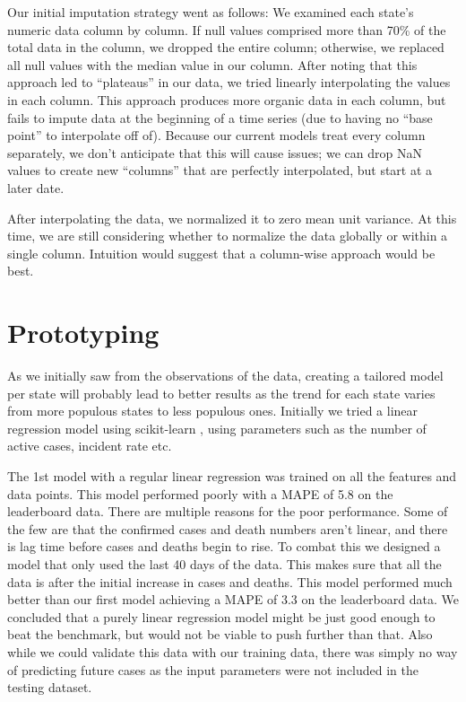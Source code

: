 \documentclass[sigconf,nonacm]{acmart}
\begin{document}
Our initial imputation strategy went as follows: 
We examined each state’s numeric data column by column. If null values
comprised more than 70\% of the total data in the column, we dropped the entire
column; otherwise, we replaced all null values with the median value in our
column. 
After noting that this approach led to “plateaus” in our data, we tried
linearly interpolating the values in each column. This approach produces more
organic data in each column, but fails to impute data at the beginning of a
time series (due to having no “base point” to interpolate off of). Because our
current models treat every column separately, we don’t anticipate that this
will cause issues; we can drop NaN values to create new “columns” that are
perfectly interpolated, but start at a later date.  

After interpolating the data, we normalized it to zero mean unit variance. At
this time, we are still considering whether to normalize the data globally or
within a single column. Intuition would suggest that a column-wise approach
would be best.

\section{Prototyping}

As we initially saw from the observations of the data, creating a tailored
model per state will probably lead to better results as the trend for each
state varies from more populous states to less populous ones. Initially we
tried a linear regression model using scikit-learn \cite{scikit-learn}, using
parameters such as the number of active cases, incident rate etc. 

The 1st model with a regular linear regression was trained on all the features
and data points. This model performed poorly with a MAPE of 5.8 on the
leaderboard data. There are multiple reasons for the poor performance. Some of
the few are that the confirmed cases and death numbers aren't linear, and there
is lag time before cases and deaths begin to rise. To combat this we designed a
model that only used the last 40 days of the data. This makes sure that all the
data is after the initial increase in cases and deaths. This model performed
much better than our first model achieving a MAPE of 3.3 on the leaderboard
data. We concluded that a purely linear regression model might be just good
enough to beat the benchmark, but would not be viable to push further than
that.  Also while we could validate this data with our training data, there was
simply no way of predicting future cases as the input parameters were not
included in the testing dataset. 
\end{document}
